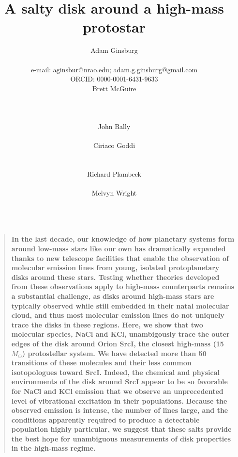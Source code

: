 \documentclass[12pt]{article}
\date{}
\author{
Adam Ginsburg\\
\nraojansky\\
e-mail: aginsbur@nrao.edu; adam.g.ginsburg@gmail.com\\
ORCID: 0000-0001-6431-9633 \\
Brett McGuire\\
\hubble\\
\nraocv\\
\cfa\\
John Bally\\
\casa\\
Ciriaco Goddi\\
\allegro\\
\radboud\\
Richard Plambeck\\
\berkeley\\
Melvyn Wright\\
\berkeley\\
}
\title{A salty disk around a high-mass protostar}
\newenvironment{sciabstract}{%
\begin{quote} \bf  }
{\end{quote}}
\newcommand{\bam}[1]{\textcolor{green!65!black}{\textbf{[BAM: #1]}}}
\newcommand{\sourcei}{SrcI\xspace}
\newcommand{\msun}{\ensuremath{M_{\odot}}\xspace}			%
\begin{document}


\maketitle

\begin{sciabstract}
 In the last decade, our knowledge of how planetary systems form around
 low-mass stars like our own has dramatically expanded thanks to new telescope
 facilities that enable the observation of molecular emission lines from young,
 isolated protoplanetary disks around these stars.  Testing whether theories
 developed from these observations apply to high-mass counterparts remains a
 substantial challenge, as disks around high-mass stars are typically observed
 while still embedded in their natal molecular cloud, and thus most molecular
 emission lines do not uniquely trace the disks in these regions. Here, we show
 that two molecular species, NaCl and KCl, unambigously trace the outer edges
 of the disk around Orion \sourcei, the closest high-mass (15~\msun)
 protostellar system.  We have detected more than 50 transitions of these
 molecules and their less common isotopologues toward \sourcei.  Indeed, the
 chemical and physical environments of the disk around \sourcei appear to be so
 favorable for NaCl and KCl emission that we observe an unprecedented level of
 vibrational excitation in their populations.  Because the observed emission is
 intense, the number of lines large, and the conditions apparently required to
 produce a detectable population highly particular, we suggest that these salts
 provide the best hope for unambiguous measurements of disk properties in the
 high-mass regime. 
\end{sciabstract}


 
\end{document}
